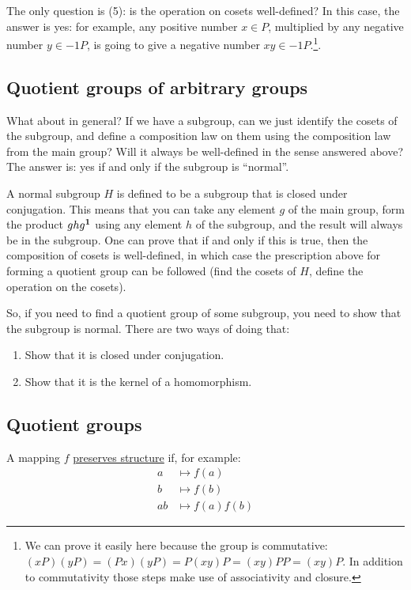 The only question is (5): is the operation on cosets well-defined? In this
case, the answer is yes: for example, any positive number $x \in P$, multiplied
by any negative number $y \in -1P$, is going to give a negative number $xy \in
-1P$.\footnote{We can prove it easily here because the group is commutative:
$(xP)(yP) = (Px)(yP) = P(xy)P = (xy)PP = (xy)P$. In addition to commutativity
those steps make use of associativity and closure.}.


\subsection{Quotient groups of arbitrary groups}

What about in general? If we have a subgroup, can we just identify the cosets
of the subgroup, and define a composition law on them using the composition law
from the main group? Will it always be well-defined in the sense answered
above? The answer is: yes if and only if the subgroup is ``normal''.

A normal subgroup $H$ is defined to be a subgroup that is closed under
conjugation. This means that you can take any element $g$ of the main group,
form the product $ghg^{\mathbf 1}$ using any element $h$ of the subgroup, and the result
will always be in the subgroup. One can prove that if and only if this is true,
then the composition of cosets is well-defined, in which case the prescription
above for forming a quotient group can be followed (find the cosets of $H$,
define the operation on the cosets).

So, if you need to find a quotient group of some subgroup, you need to show
that the subgroup is normal. There are two ways of doing that:

\begin{enumerate}
\item Show that it is closed under conjugation.
\item Show that it is the kernel of a homomorphism.
\end{enumerate}

\newpage
\subsection{Quotient groups}

A mapping $f$ \underline{preserves structure} if, for example:
\begin{align*}
  a  & \mapsto f(a)\\
  b  & \mapsto f(b)\\
  ab & \mapsto f(a)f(b)
\end{align*}


